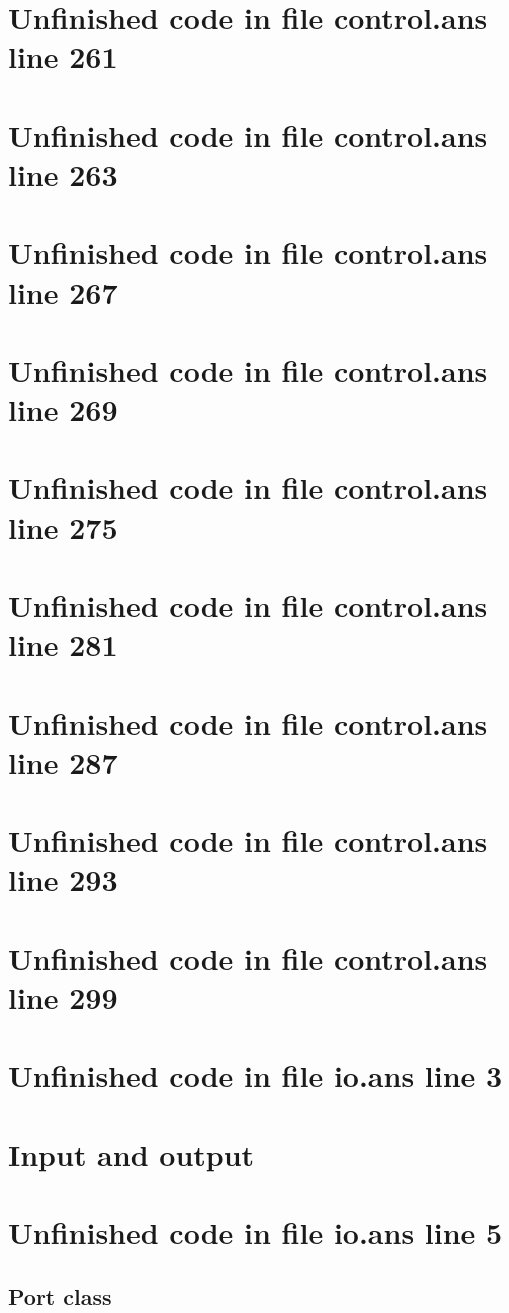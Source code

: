 \documentclass[twoside,9pt]{report}
\begin{document}
\section{Unfinished code in file control.ans line 261}
\section{Unfinished code in file control.ans line 263}
\section{Unfinished code in file control.ans line 267}
\section{Unfinished code in file control.ans line 269}
\section{Unfinished code in file control.ans line 275}
\section{Unfinished code in file control.ans line 281}
\section{Unfinished code in file control.ans line 287}
\section{Unfinished code in file control.ans line 293}
\section{Unfinished code in file control.ans line 299}
\section{Unfinished code in file io.ans line 3}
\section{Input and output}
\label{input-and-output}
\section{Unfinished code in file io.ans line 5}
\subsection{Port class}
\label{port-class}
\end{document}
